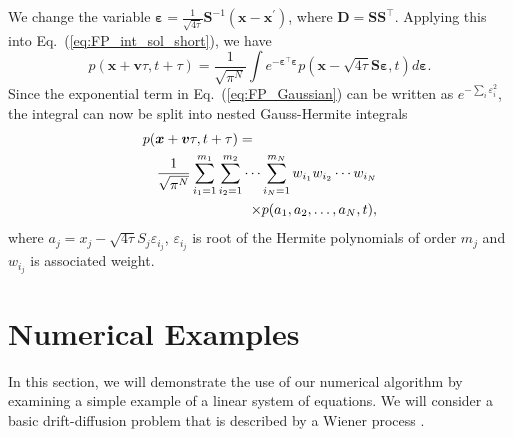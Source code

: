 \documentclass[aps,pre,reprint,superscriptaddress,showpacs,amsmath
,floatfix
]{revtex4-2}
\renewcommand{\vec}[1]{\boldsymbol{#1}}
\newcommand{\mat}[1]{\textbf{#1}}
\newcommand{\eq}[1]{Eq.~(\ref{#1})}
\begin{document}
We change the variable $\vec{\varepsilon} = \frac{1}{\sqrt{4\tau}} \mat{S}^{-1}(\vec{x}-\vec{x}^\prime)$, where $\mat{D}=\mat{S}\mat{S}^\top$. Applying this into \eq{eq:FP_int_sol_short}, we have
\begin{equation}\label{eq:FP_Gaussian}
    p(\vec{x}+\vec{v}\tau,t+\tau) =  \frac{1}{ \sqrt{\pi^N} } \int  e^{ -\vec{\varepsilon}^\top \vec{\varepsilon}} p(\vec{x}-\sqrt{4\tau}\mat{S}\vec{\varepsilon},t) d\vec{\varepsilon} . 
\end{equation}
Since the exponential term in \eq{eq:FP_Gaussian} can be written as $e^{-\sum_i \varepsilon_i^2}$, the integral can now be split into nested Gauss-Hermite integrals \cite{jackel2005note}
\begin{eqnarray}\label{eq:FP_GH}
    \lefteqn{
    p(\vec{x}+\vec{v}\tau,t+\tau) = } \nonumber \\
    &&  \frac{1}{ \sqrt{\pi^N} } \sum_{i_1=1}^{m_1} \sum_{i_2=1}^{m_2}  \cdots \sum_{i_N=1}^{m_N} w_{i_1} w_{i_2} \cdots w_{i_N} \nonumber \\
    && \times p(a_1, a_2, \dots, a_N, t) ,
\end{eqnarray}
where $a_j = x_j-\sqrt{4\tau}S_j \varepsilon_{i_j}$, $\varepsilon_{i_j}$ is root of the Hermite polynomials of order $m_j$ and $w_{i_j}$ is associated weight. 

\section{Numerical Examples}
In this section, we will demonstrate the use of our numerical algorithm by examining a simple example of a linear system of equations. We will consider a basic drift-diffusion problem that is described by a Wiener process \cite{risken1996fokker, frank2005nonlinear}.

\end{document}

